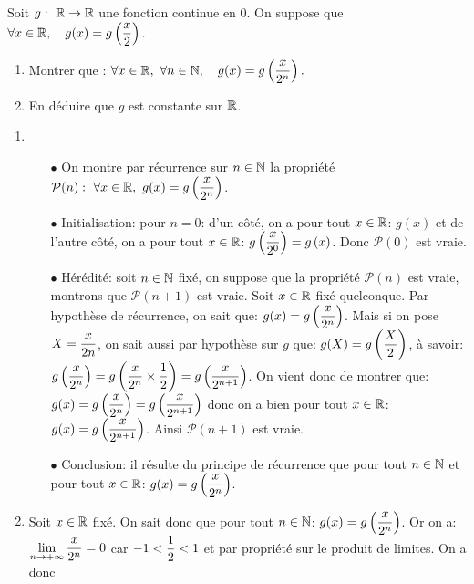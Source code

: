 \documentclass[a4paper, 11pt,reqno]{article}
\begin{document}
\begin{exercice}  \;
	Soit $g:\ \mathbb{R}\rightarrow \mathbb{R}$ une fonction continue en 0. On suppose que $\forall x\in\mathbb{R},\quad g(x)=g\left(\displaystyle\frac{x}{2} \right).$
	\begin{enumerate}
		\item Montrer que : $\forall x\in\mathbb{R},\ \forall n\in\mathbb{N},\quad g(x)=g\left( \displaystyle\frac{x}{2^n}\right).$
		\item En d\'eduire que $g$ est constante sur $\mathbb{R}$.
	\end{enumerate}
\end{exercice}
\begin{correction}  \;
	\begin{enumerate}
		\item
		      \begin{itemize}
			      \item[$\bullet$] On montre par r\'ecurrence sur $n\in\mathbb{N}$ la propri\'et\'e $\mathcal{P}(n):\ \forall x\in\mathbb{R},\ g(x)=g\left(\displaystyle\frac{x}{2^n} \right)$.
			      \item[$\bullet$] Initialisation: pour $n=0$: d'un c\^{o}t\'e, on a pour tout $x\in\mathbb{R}$: $g(x)$ et de l'autre c\^{o}t\'e, on a pour tout $x\in\mathbb{R}$: $g\left(\displaystyle\frac{x}{2^0} \right)=g\left(x \right)$. Donc $\mathcal{P}(0)$ est vraie.
			      \item[$\bullet$] H\'er\'edit\'e: soit $n\in\mathbb{N}$ fix\'e, on suppose que la propri\'et\'e $\mathcal{P}(n)$ est vraie, montrons que $\mathcal{P}(n+1)$ est vraie. Soit $x\in\mathbb{R}$ fix\'e quelconque. Par hypoth\`{e}se de r\'ecurrence, on sait que: $g(x)=g\left(\displaystyle\frac{x}{2^n} \right)$. Mais si on pose $X=\displaystyle\frac{x}{2n}$, on sait aussi par hypoth\`{e}se sur $g$ que: $g(X)=g\left( \displaystyle\frac{X}{2}\right)$, \`{a} savoir: $g\left(\displaystyle\frac{x}{2^n} \right)=g\left(\displaystyle\frac{x}{2^n}\times \displaystyle\frac{1}{2} \right)=g\left(\displaystyle\frac{x}{2^{n+1}} \right)$. On vient donc de montrer que: $g(x)=g\left(\displaystyle\frac{x}{2^n} \right)=g\left(\displaystyle\frac{x}{2^{n+1}} \right)$ donc on a bien pour tout $x\in\mathbb{R}$: $g(x)=g\left(\displaystyle\frac{x}{2^{n+1}} \right)$. Ainsi $\mathcal{P}(n+1)$ est vraie.
			      \item[$\bullet$] Conclusion: il r\'esulte du principe de r\'ecurrence que pour tout $n\in\mathbb{N}$ et pour tout $x\in\mathbb{R}$: $g(x)=g\left(\displaystyle\frac{x}{2^n} \right)$.
		      \end{itemize}
		\item Soit $x\in\mathbb{R}$ fix\'e. On sait donc que pour tout $n\in\mathbb{N}$: $g(x)=g\left(\displaystyle\frac{x}{2^n} \right)$. Or on a: $\lim\limits_{n\to +\infty} \displaystyle\frac{x}{2^n}=0$ car $-1<\displaystyle\frac{1}{2} <1$ et par propri\'et\'e sur le produit de limites. On a donc

\end{enumerate}
\end{correction}
\end{document}
